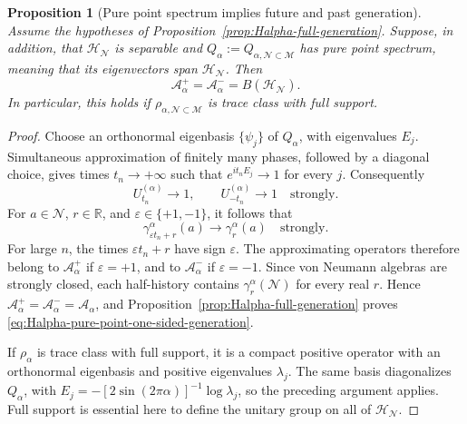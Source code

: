 \documentclass[a4paper,11pt]{article}
\newtheorem{proposition}[theorem]{Proposition}
\theoremstyle{definition}
\newcommand{\mN}{\mathcal{N}}
\newcommand{\mH}{\mathcal{H}}
\newcommand{\mM}{\mathcal{M}}
\begin{document}
\begin{proposition}[Pure point spectrum implies future and past generation]
\label{prop:Halpha-pure-point-one-sided-generation}
Assume the hypotheses of Proposition~\ref{prop:Halpha-full-generation}.
Suppose, in addition, that $\mH_{\mN}$ is separable and
$Q_\alpha:=Q_{\alpha,\mN\subset\mM}$ has pure point spectrum, meaning
that its eigenvectors span $\mH_{\mN}$. Then
\begin{equation}
    \boxed{
    \mathcal A_\alpha^+
    =\mathcal A_\alpha^-
    =B(\mH_{\mN}).
    }
    \label{eq:Halpha-pure-point-one-sided-generation}
\end{equation}
In particular, this holds if
$\rho_{\alpha,\mN\subset\mM}$ is trace class with full support.
\end{proposition}

\begin{proof}
Choose an orthonormal eigenbasis $\{\psi_j\}$ of $Q_\alpha$, with
eigenvalues $E_j$. Simultaneous approximation of finitely many phases,
followed by a diagonal choice, gives times $t_n\to+\infty$ such that
$e^{it_nE_j}\to1$ for every $j$. Consequently
\begin{equation}
    U_{t_n}^{(\alpha)}\longrightarrow1,
    \qquad U_{-t_n}^{(\alpha)}\longrightarrow1
    \quad\text{strongly}.
    \label{eq:Halpha-pure-point-recurrence}
\end{equation}
For $a\in\mN$, $r\in\mathbb R$, and
$\varepsilon\in\{+1,-1\}$, it follows that
\begin{equation}
    \gamma_{\varepsilon t_n+r}^\alpha(a)
    \longrightarrow\gamma_r^\alpha(a)
    \quad\text{strongly}.
    \label{eq:Halpha-one-sided-recurrence-approximation}
\end{equation}
For large $n$, the times $\varepsilon t_n+r$ have sign $\varepsilon$.
The approximating operators therefore belong to
$\mathcal A_\alpha^+$ if $\varepsilon=+1$, and to
$\mathcal A_\alpha^-$ if $\varepsilon=-1$. Since von Neumann algebras
are strongly closed, each half-history contains
$\gamma_r^\alpha(\mN)$ for every real $r$. Hence
$\mathcal A_\alpha^+=\mathcal A_\alpha^-=\mathcal A_\alpha$, and
Proposition~\ref{prop:Halpha-full-generation} proves
\eqref{eq:Halpha-pure-point-one-sided-generation}.

If $\rho_\alpha$ is trace class with full support, it is a compact
positive operator with an orthonormal eigenbasis and positive
eigenvalues $\lambda_j$. The same basis diagonalizes $Q_\alpha$, with
$E_j=-[2\sin(2\pi\alpha)]^{-1}\log\lambda_j$, so the preceding argument
applies. Full support is essential here to define the unitary group
on all of $\mH_{\mN}$.
\end{proof}
\end{document}

